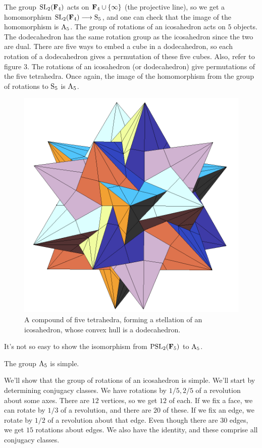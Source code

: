 \documentclass[11pt, oneside]{amsart}
\begin{document}
The group $\operatorname{SL}_2(\mathbf F_4)$ acts on $\mathbf F_4 \cup \{ \infty\}$ (the projective line), so we get a homomorphism $\operatorname{SL}_2(\mathbf F_4)\longrightarrow \operatorname{S}_5$, and one can check that the image of the homomorphism is $\operatorname{A}_5$. The group of rotations of an icosahedron acts on $5$ objects. The dodecahedron has the same rotation group as the icosahedron since the two are dual. There are five ways to embed a cube in a dodecahedron, so each rotation of a dodecahedron gives a permutation of these five cubes. Also, refer to figure 3. The rotations of an icosahedron (or dodecahedron) give permutations of the five tetrahedra. Once again, the image of the homomorphism from the group of rotations to $\operatorname{S}_5$ is $\operatorname{A}_5$.
\begin{figure}
\centering
\includegraphics[scale=0.7]{images/icosahedron_tetrahedral_stellation}
\caption{A compound of five tetrahedra, forming a stellation of an icosahedron, whose convex hull is a dodecahedron.}
\end{figure}
It's not so easy to show the isomorphism from $\operatorname{PSL}_2(\mathbf F_5) $ to $\operatorname{A}_5$.

\begin{proposition}
The group $\operatorname{A}_5$ is simple.
\end{proposition}

We'll show that the group of rotations of an icosahedron is simple. We'll start by determining conjugacy classes. We have rotations by $1/5, 2/5$ of a revolution about some axes. There are $12$ vertices, so we get $12$ of each. If we fix a face, we can rotate by $1/3$ of a revolution, and there are $20$ of these. If we fix an edge, we rotate by $1/2$ of a revolution about that edge. Even though there are $30$ edges, we get $15$ rotations about edges. We also have the identity, and these comprise all conjugacy classes.
\end{document}
